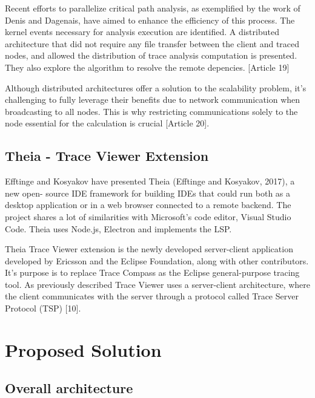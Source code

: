 Recent efforts to parallelize critical path analysis, as exemplified by the work of Denis and Dagenais, have aimed to enhance the efficiency of this process. The kernel events necessary for analysis execution are identified. A distributed architecture that did not require any file transfer between the client and traced nodes, and allowed the distribution of trace analysis computation is presented. They also explore the algorithm to resolve the remote depencies. [Article 19]

Although distributed architectures offer a solution to the scalability problem, it's challenging to fully leverage their benefits due to network communication when broadcasting to all nodes. This is why restricting communications solely to the node essential for the calculation is crucial [Article 20].


\subsection{Theia - Trace Viewer Extension}

Eﬀtinge and Kosyakov have presented Theia (Eﬀtinge and Kosyakov, 2017), a new open-
source IDE framework for building IDEs that could run both as a desktop application or in
a web browser connected to a remote backend. The project shares a lot of similarities with
Microsoft's code editor, Visual Studio Code. Theia uses Node.js, Electron and implements
the LSP.


Theia Trace Viewer extension is the newly developed server-client application developed by Ericsson and the Eclipse Foundation, along with other contributors. It's purpose is to replace Trace Compass as the Eclipse general-purpose tracing tool. As previously described Trace Viewer uses a server-client architecture, where the client communicates with the server through a protocol called Trace Server Protocol (TSP) [10].

\section{Proposed Solution}
\subsection{Overall architecture}
\subsection{}


